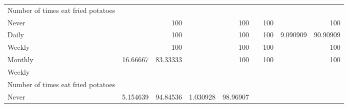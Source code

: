 \documentclass{article}
\begin{document}
\begin{tabular}{lllllllll}
\multicolumn{1}{l}{\hspace{6em}Number of times eat fried potatoes} &
  \multicolumn{1}{|r}{} &
  \multicolumn{1}{r}{} &
  \multicolumn{1}{r}{} &
  \multicolumn{1}{r}{} &
  \multicolumn{1}{r}{} &
  \multicolumn{1}{r}{} &
  \multicolumn{1}{r}{} &
  \multicolumn{1}{r}{} \\
\multicolumn{1}{l}{\hspace{7em}Never} &
  \multicolumn{1}{|r}{} &
  \multicolumn{1}{r}{100} &
  \multicolumn{1}{r}{} &
  \multicolumn{1}{r}{100} &
  \multicolumn{1}{r}{} &
  \multicolumn{1}{r}{100} &
  \multicolumn{1}{r}{} &
  \multicolumn{1}{r}{100} \\
\multicolumn{1}{l}{\hspace{7em}Daily} &
  \multicolumn{1}{|r}{} &
  \multicolumn{1}{r}{100} &
  \multicolumn{1}{r}{} &
  \multicolumn{1}{r}{100} &
  \multicolumn{1}{r}{} &
  \multicolumn{1}{r}{100} &
  \multicolumn{1}{r}{9.090909} &
  \multicolumn{1}{r}{90.90909} \\
\multicolumn{1}{l}{\hspace{7em}Weekly} &
  \multicolumn{1}{|r}{} &
  \multicolumn{1}{r}{100} &
  \multicolumn{1}{r}{} &
  \multicolumn{1}{r}{100} &
  \multicolumn{1}{r}{} &
  \multicolumn{1}{r}{100} &
  \multicolumn{1}{r}{} &
  \multicolumn{1}{r}{100} \\
\multicolumn{1}{l}{\hspace{7em}Monthly} &
  \multicolumn{1}{|r}{16.66667} &
  \multicolumn{1}{r}{83.33333} &
  \multicolumn{1}{r}{} &
  \multicolumn{1}{r}{100} &
  \multicolumn{1}{r}{} &
  \multicolumn{1}{r}{100} &
  \multicolumn{1}{r}{} &
  \multicolumn{1}{r}{100} \\
\multicolumn{1}{l}{\hspace{5em}Weekly} &
  \multicolumn{1}{|r}{} &
  \multicolumn{1}{r}{} &
  \multicolumn{1}{r}{} &
  \multicolumn{1}{r}{} &
  \multicolumn{1}{r}{} &
  \multicolumn{1}{r}{} &
  \multicolumn{1}{r}{} &
  \multicolumn{1}{r}{} \\
\multicolumn{1}{l}{\hspace{6em}Number of times eat fried potatoes} &
  \multicolumn{1}{|r}{} &
  \multicolumn{1}{r}{} &
  \multicolumn{1}{r}{} &
  \multicolumn{1}{r}{} &
  \multicolumn{1}{r}{} &
  \multicolumn{1}{r}{} &
  \multicolumn{1}{r}{} &
  \multicolumn{1}{r}{} \\
\multicolumn{1}{l}{\hspace{7em}Never} &
  \multicolumn{1}{|r}{5.154639} &
  \multicolumn{1}{r}{94.84536} &
  \multicolumn{1}{r}{1.030928} &
  \multicolumn{1}{r}{98.96907} &

\end{tabular}
\end{document}
